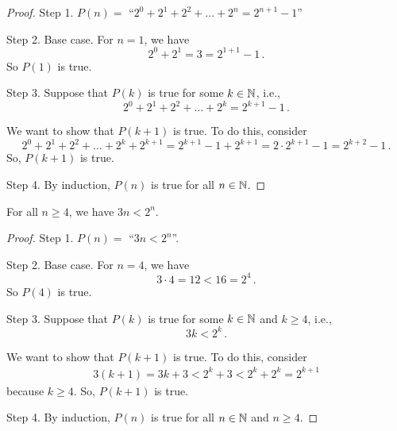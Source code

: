 \documentclass[12pt]{amsart}
\begin{document}
\begin{proof}
    Step 1. $P(n) =$ ``$2^0 + 2^1 + 2^2 + \dots+ 2^n = 2^{n+1}-1$'' 

    Step 2. Base case. For $n =1$, we have
    \begin{equation*}
        2^0 + 2^1 = 3 = 2^{1+1} - 1 \,.
    \end{equation*}
    So $P(1)$ is true.


    Step 3. Suppose that $P(k)$ is true for some $k\in \mathbb{N}$, i.e.,
    \begin{equation*}
        2^0 + 2^1 + 2^2 + \dots+ 2^k = 2^{k+1}-1 \,.
    \end{equation*}

    We want to show that $P(k+1)$ is true. To do this, consider
    \begin{equation*}
        2^0 + 2^1 + 2^2 + \dots+ 2^k + 2^{k+1} = 2^{k+1} - 1 + 2^{k+1} = 2\cdot  2^{k+1} - 1 = 2^{k+2} - 1\,.
    \end{equation*}
    So, $P(k+1)$ is true.

    Step 4. By induction, $P(n)$ is true for all $n\in \mathbb{N}$.
\end{proof}


\begin{problem}
    For all $n \geq 4$, we have $3n < 2^n$.
\end{problem}

\begin{proof}
    Step 1. $P(n) =$ ``$3n < 2^n$''. 

    Step 2. Base case. For $n =4$, we have
        \begin{equation*}
            3\cdot 4 = 12 < 16 = 2^4 \,.
        \end{equation*}
    So $P(4)$ is true.


    Step 3. Suppose that $P(k)$ is true for some $k\in \mathbb{N}$ and $k\geq 4$, i.e.,
    \begin{equation*}
        3 k < 2^k \,.
    \end{equation*}

    We want to show that $P(k+1)$ is true. To do this, consider
        \begin{align*}
            3(k+1) = 3k + 3 < 2^k + 3 < 2^k + 2^k  = 2^{k+1}
        \end{align*}
        because $k\geq 4$.
    So, $P(k+1)$ is true.

    Step 4. By induction, $P(n)$ is true for all $n\in \mathbb{N}$ and $n\geq 4$.
\end{proof}
\end{document}
